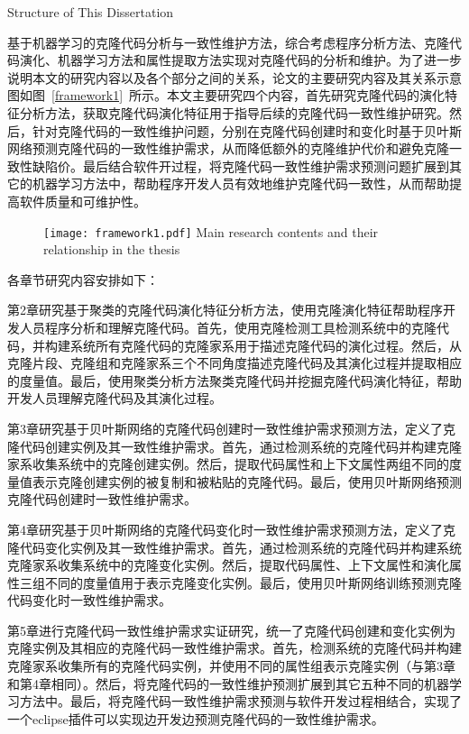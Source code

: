 {Structure of This Dissertation}

基于机器学习的克隆代码分析与一致性维护方法，综合考虑程序分析方法、克隆代码演化、机器学习方法和属性提取方法实现对克隆代码的分析和维护。为了进一步说明本文的研究内容以及各个部分之间的关系，论文的主要研究内容及其关系示意图如图~\ref{framework1}~所示。本文主要研究四个内容，首先研究克隆代码的演化特征分析方法，获取克隆代码演化特征用于指导后续的克隆代码一致性维护研究。然后，针对克隆代码的一致性维护问题，分别在克隆代码创建时和变化时基于贝叶斯网络预测克隆代码的一致性维护需求，从而降低额外的克隆维护代价和避免克隆一致性缺陷价。最后结合软件开过程，将克隆代码一致性维护需求预测问题扩展到其它的机器学习方法中，帮助程序开发人员有效地维护克隆代码一致性，从而帮助提高软件质量和可维护性。

\begin{figure}[htbp]
\centering
\texttt{[image: framework1.pdf]}
{Main research contents and their relationship in the thesis}
\vspace{-1em}
\end{figure}

各章节研究内容安排如下：

第2章研究基于聚类的克隆代码演化特征分析方法，使用克隆演化特征帮助程序开发人员程序分析和理解克隆代码。首先，使用克隆检测工具检测系统中的克隆代码，并构建系统所有克隆代码的克隆家系用于描述克隆代码的演化过程。然后，从克隆片段、克隆组和克隆家系三个不同角度描述克隆代码及其演化过程并提取相应的度量值。最后，使用聚类分析方法聚类克隆代码并挖掘克隆代码演化特征，帮助开发人员理解克隆代码及其演化过程。

第3章研究基于贝叶斯网络的克隆代码创建时一致性维护需求预测方法，定义了克隆代码创建实例及其一致性维护需求。首先，通过检测系统的克隆代码并构建克隆家系收集系统中的克隆创建实例。然后，提取代码属性和上下文属性两组不同的度量值表示克隆创建实例的被复制和被粘贴的克隆代码。最后，使用贝叶斯网络预测克隆代码创建时一致性维护需求。

第4章研究基于贝叶斯网络的克隆代码变化时一致性维护需求预测方法，定义了克隆代码变化实例及其一致性维护需求。首先，通过检测系统的克隆代码并构建系统克隆家系收集系统中的克隆变化实例。然后，提取代码属性、上下文属性和演化属性三组不同的度量值用于表示克隆变化实例。最后，使用贝叶斯网络训练预测克隆代码变化时一致性维护需求。

第5章进行克隆代码一致性维护需求实证研究，统一了克隆代码创建和变化实例为克隆实例及其相应的克隆代码一致性维护需求。首先，检测系统的克隆代码并构建克隆家系收集所有的克隆代码实例，并使用不同的属性组表示克隆实例（与第3章和第4章相同）。然后，将克隆代码的一致性维护预测扩展到其它五种不同的机器学习方法中。最后，将克隆代码一致性维护需求预测与软件开发过程相结合，实现了一个eclipse插件可以实现边开发边预测克隆代码的一致性维护需求。
